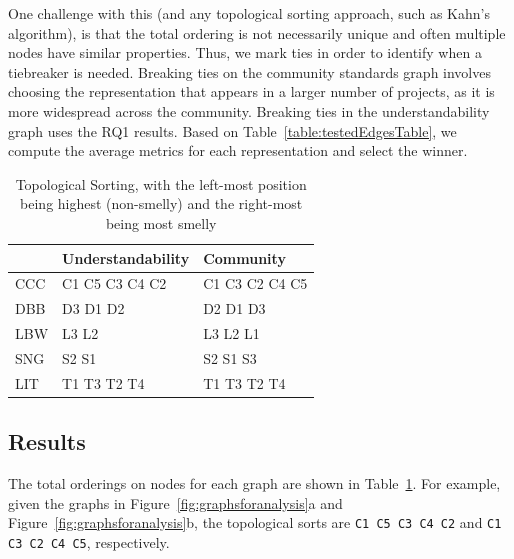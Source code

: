 One challenge with this (and any topological sorting approach, such as Kahn's algorithm), is that the total ordering is not necessarily unique and often multiple nodes have similar properties.
Thus, we mark ties in order to identify when a tiebreaker is needed.
Breaking ties on the community standards graph involves choosing the representation that appears in a larger number of projects, as it is more widespread across the community.
Breaking ties in the understandability graph uses the RQ1 results. Based on Table~\ref{table:testedEdgesTable}, we compute the average metrics for each representation and select the winner.

\begin{table}
\vspace{2mm}
\centering
\caption{Topological Sorting, with the left-most position being highest (non-smelly) and the right-most being most smelly \label{topologicalResults} }
\vspace{-3pt}
\begin{tabular}{| l | l | l |}  \hline
& Understandability & Community  \\ \hline
CCC & C1 C5 C3 C4 C2  &   C1 C3 C2 C4 C5  \\
DBB & D3 D1 D2  &   D2 D1 D3\\
 LBW & L3 L2	 &  L3 L2 L1 	\\
 SNG &  S2 S1 &  S2 S1 S3 \\
 LIT & T1 T3 T2 T4 & T1 T3 T2 T4 \\
\hline
\end{tabular}
\vspace{-6pt}
\vspace{-3pt}
\end{table}


\subsection{Results}
The total orderings on nodes for each graph are shown in Table~\ref{topologicalResults}. For example, given the graphs in Figure~\ref{fig:graphsforanalysis}a and Figure~\ref{fig:graphsforanalysis}b, the topological sorts are {\tt C1 C5 C3 C4 C2} and {\tt C1 C3 C2 C4 C5}, respectively.



